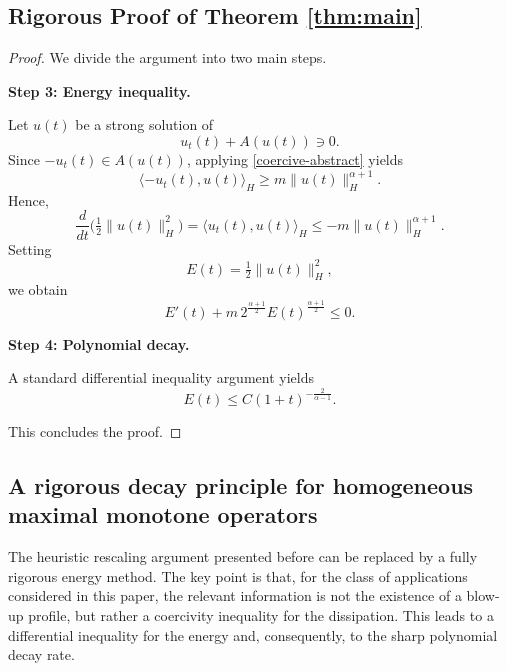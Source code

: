 \documentclass[11pt,reqno]{amsart}
\theoremstyle{remark}
\begin{document}
\subsection{Rigorous Proof of Theorem \ref{thm:main}}

\begin{proof}
We divide the argument into two main steps.

\medskip
\noindent\textbf{Step 3: Energy inequality.}

Let $u(t)$ be a strong solution of
\[
u_t(t)+A(u(t))\ni 0.
\]
Since $-u_t(t)\in A(u(t))$, applying \eqref{coercive-abstract} yields
\[
\langle -u_t(t),u(t)\rangle_H \ge m \|u(t)\|_H^{\alpha+1}.
\]
Hence,
\[
\frac{d}{dt}\Big(\tfrac12\|u(t)\|_H^2\Big)
=\langle u_t(t),u(t)\rangle_H
\le -m\|u(t)\|_H^{\alpha+1}.
\]
Setting
\[
E(t)=\tfrac12\|u(t)\|_H^2,
\]
we obtain
\[
E'(t)+m\,2^{\frac{\alpha+1}{2}}E(t)^{\frac{\alpha+1}{2}}\le 0.
\]

\medskip
\noindent\textbf{Step 4: Polynomial decay.}

A standard differential inequality argument yields
\[
E(t)\le C(1+t)^{-\frac{2}{\alpha-1}}.
\]

This concludes the proof.
\end{proof}

\subsection{A rigorous decay principle for homogeneous maximal monotone operators}

The heuristic rescaling argument presented before can be replaced by a fully rigorous energy method.
The key point is that, for the class of applications considered in this paper, the relevant information
is not the existence of a blow-up profile, but rather a coercivity inequality for the dissipation.
This leads to a differential inequality for the energy and, consequently, to the sharp polynomial decay rate.
\end{document}
